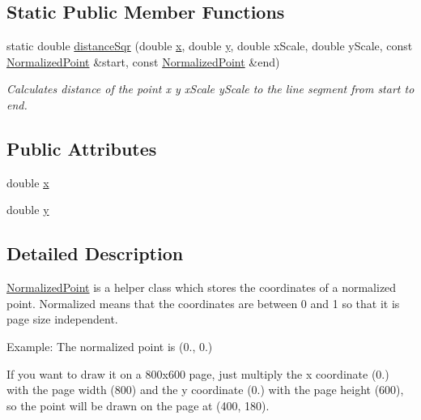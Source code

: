 \subsection*{Static Public Member Functions}
\begin{DoxyCompactItemize}
\item 
static double \hyperlink{classOkular_1_1NormalizedPoint_aff8e93bf86fd23f2e1b502ee3d0bac31}{distance\+Sqr} (double \hyperlink{classOkular_1_1NormalizedPoint_a857f49b9bc7712430d167472ef9dbd94}{x}, double \hyperlink{classOkular_1_1NormalizedPoint_ac2276daabda627d5f82bb1532c293047}{y}, double x\+Scale, double y\+Scale, const \hyperlink{classOkular_1_1NormalizedPoint}{Normalized\+Point} \&start, const \hyperlink{classOkular_1_1NormalizedPoint}{Normalized\+Point} \&end)
\begin{DoxyCompactList}\small\item\em Calculates distance of the point {\ttfamily x} {\ttfamily y} {\ttfamily x\+Scale} {\ttfamily y\+Scale} to the line segment from {\ttfamily start} to {\ttfamily end}. \end{DoxyCompactList}\end{DoxyCompactItemize}
\subsection*{Public Attributes}
\begin{DoxyCompactItemize}
\item 
double \hyperlink{classOkular_1_1NormalizedPoint_a857f49b9bc7712430d167472ef9dbd94}{x}
\item 
double \hyperlink{classOkular_1_1NormalizedPoint_ac2276daabda627d5f82bb1532c293047}{y}
\end{DoxyCompactItemize}


\subsection{Detailed Description}
\hyperlink{classOkular_1_1NormalizedPoint}{Normalized\+Point} is a helper class which stores the coordinates of a normalized point. Normalized means that the coordinates are between 0 and 1 so that it is page size independent.

Example\+: The normalized point is (0., 0.)

If you want to draw it on a 800x600 page, just multiply the x coordinate (0.) with the page width (800) and the y coordinate (0.) with the page height (600), so the point will be drawn on the page at (400, 180).

